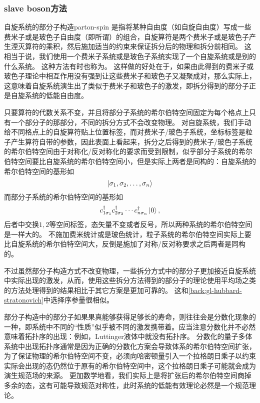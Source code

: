 \subsubsection{slave boson方法}

\begin{back}{自旋系统的部分子构造}{parton-spin}
    是指将某种自由度（如自旋自由度）写成一些费米子或是玻色子自由度（即所谓）的组合，自旋算符是两个费米子或是玻色子产生湮灭算符的乘积，然后施加适当的约束来保证拆分后的物理和拆分前相同。
    这相当于说，我们使用一个费米子系统或是玻色子系统实现了一个自旋系统或是别的什么系统。
    这种方法有时也称为。
    这样做的好处在于，如果由此得到的费米子或玻色子理论中相互作用没有强到让这些费米子和玻色子又凝聚成对，那么实际上，这意味着自旋系统演生出了类似于费米子和玻色子的激发，即拆分得到的部分子正是自旋系统的低能自由度。

    只要算符的代数关系不变，并且将部分子系统的希尔伯特空间固定为每个格点上只有一个部分子的那部分，不同的拆分方式不会改变物理。
    对自旋系统，我们手动给不同格点上的自旋算符贴上位置标签，而对费米子/玻色子系统，坐标标签是粒子产生算符自带的参数，因此表面上看起来，拆分之后得到的费米子/玻色子系统的希尔伯特空间由于对称化/反对称化的要求而受到限制，似乎部分子系统的希尔伯特空间要比自旋系统的希尔伯特空间小，但是实际上两者是同构的：自旋系统的希尔伯特空间的基形如
    \[
        \ket{\sigma_1, \sigma_2, \ldots, \sigma_n}
    \]
    而部分子系统的希尔伯特空间的基形如
    \[
        {c}^\dagger_{1 \sigma_1} {c}^\dagger_{2 \sigma_2} \cdots {c}^\dagger_{n \sigma_n} \ket{0},
    \]
    后者中交换$1, 2$等空间标签，态矢量不变或者反号，所以两种系统的希尔伯特空间是一样大的。
    不施加费米统计或是玻色统计，粒子系统的希尔伯特空间实际上要比自旋系统的希尔伯特空间大，反倒是施加了对称/反对称要求之后两者是同构的。

    不过虽然部分子构造方式不改变物理，一些拆分方式中的部分子更加接近自旋系统中实际出现的激发，从而，使用这些拆分方法得到的部分子的理论使用平均场之类的方法处理得到的结果相比于其它方案是更加可靠的。
    这和\autoref{back:gl-hubbard-stratonovich}中选择序参量很相似。

    部分子构造中的部分子如果果真能够获得足够长的寿命，则往往会是分数化现象的一种，即系统中不同的“性质”似乎被不同的激发携带着。应当注意分数化并不必然意味着拓扑序的出现：例如，Luttinger液体中就没有拓扑序。
    分数化的量子多体系统中出现拓扑序通常是因为正确的分数化方案会导致体系的希尔伯特空间扩张，为了保证物理的希尔伯特空间不变，必须向哈密顿量引入一个拉格朗日乘子以约束实际会出现的态仍然位于原有的希尔伯特空间中，这个拉格朗日乘子可能就会成为演生规范场的来源。
    更加数学地看，我们实际上是将扩张后的希尔伯特空间商掉多余的态，这有可能导致规范对称性，此时系统的低能有效理论必然是一个规范理论。
\end{back}

